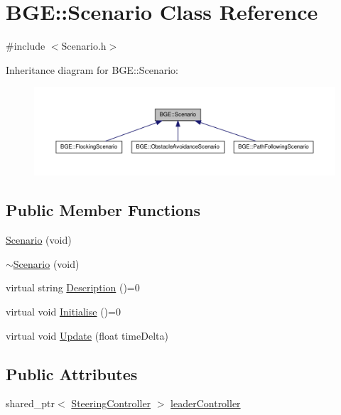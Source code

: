 \hypertarget{class_b_g_e_1_1_scenario}{\section{B\-G\-E\-:\-:Scenario Class Reference}
\label{class_b_g_e_1_1_scenario}
}


{\ttfamily \#include $<$Scenario.\-h$>$}



Inheritance diagram for B\-G\-E\-:\-:Scenario\-:
\nopagebreak
\begin{figure}[H]
\begin{center}
\leavevmode
\includegraphics[width=350pt]{class_b_g_e_1_1_scenario__inherit__graph}
\end{center}
\end{figure}
\subsection*{Public Member Functions}
\begin{DoxyCompactItemize}
\item 
\hyperlink{class_b_g_e_1_1_scenario_a1f4614add899dcbe0d92cbba04a06ce2}{Scenario} (void)
\item 
\hyperlink{class_b_g_e_1_1_scenario_a35792727e30f9d6e9b107a5c2acd789d}{$\sim$\-Scenario} (void)
\item 
virtual string \hyperlink{class_b_g_e_1_1_scenario_a9332e7ebd4d127d17b808390baa3564b}{Description} ()=0
\item 
virtual void \hyperlink{class_b_g_e_1_1_scenario_a0fe2ffbe5e12855af787ed716cf9b977}{Initialise} ()=0
\item 
virtual void \hyperlink{class_b_g_e_1_1_scenario_a90fda911795cfa4fce1dae52da954922}{Update} (float time\-Delta)
\end{DoxyCompactItemize}
\subsection*{Public Attributes}
\begin{DoxyCompactItemize}
\item 
shared\-\_\-ptr$<$ \hyperlink{class_b_g_e_1_1_steering_controller}{Steering\-Controller} $>$ \hyperlink{class_b_g_e_1_1_scenario_a749a0fd4060bccfd020d15925ddbdbe8}{leader\-Controller}
\end{DoxyCompactItemize}


